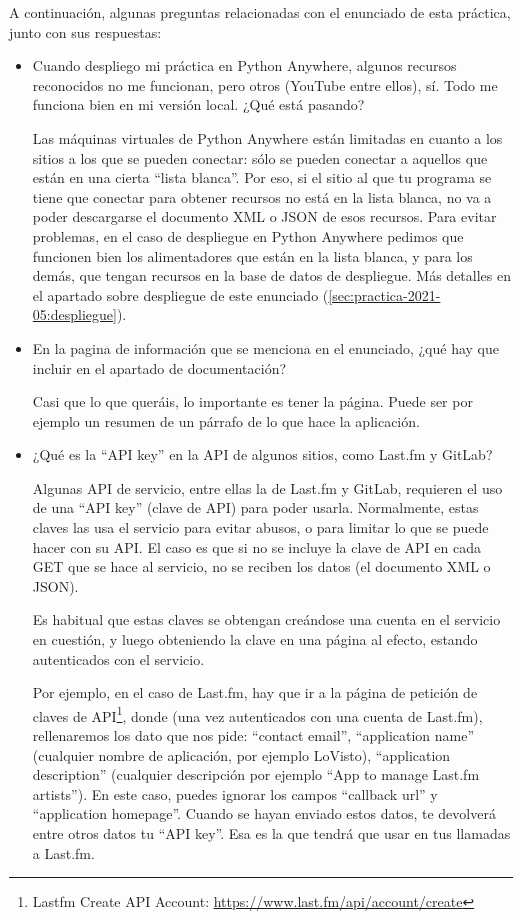 A continuación, algunas preguntas relacionadas con el enunciado de esta práctica, junto con sus respuestas:

\begin{itemize}

\item Cuando despliego mi práctica en Python Anywhere, algunos recursos reconocidos no me funcionan, pero otros (YouTube entre ellos), sí. Todo me funciona bien en mi versión local. ¿Qué está pasando?

  Las máquinas virtuales de Python Anywhere están limitadas en cuanto a los sitios a los que se pueden conectar: sólo se pueden conectar a aquellos que están en una cierta ``lista blanca''. Por eso, si el sitio al que tu programa se tiene que conectar para obtener recursos no está en la lista blanca, no va a poder descargarse el documento XML o JSON de esos recursos. Para evitar problemas, en el caso de despliegue en Python Anywhere pedimos que funcionen bien los alimentadores que están en la lista blanca, y para los demás, que tengan recursos en la base de datos de despliegue. Más detalles en el apartado sobre despliegue de este enunciado (\ref{sec:practica-2021-05:despliegue}).
  
\item En la pagina de información que se menciona en el enunciado, ¿qué hay que incluir en el apartado de documentación?

Casi que lo que queráis, lo importante es tener la página. Puede ser por ejemplo un resumen de un párrafo de lo que hace la aplicación.

\item ¿Qué es la ``API key'' en la API de algunos sitios, como Last.fm y GitLab?
\label{sec:practica-2021-05:preguntas-apikey}

  Algunas API de servicio, entre ellas la de Last.fm y GitLab, requieren el uso de una ``API key'' (clave de API) para poder usarla. Normalmente, estas claves las usa el servicio para evitar abusos, o para limitar lo que se puede hacer con su API. El caso es que si no se incluye la clave de API en cada GET que se hace al servicio, no se reciben los datos (el documento XML o JSON).

  Es habitual que estas claves se obtengan creándose una cuenta en el servicio en cuestión, y luego obteniendo la clave en una página al efecto, estando autenticados con el servicio.

  Por ejemplo, en el caso de Last.fm, hay que ir a la página de petición de claves de API\footnote{Lastfm Create API Account: \url{https://www.last.fm/api/account/create}}, donde (una vez autenticados con una cuenta de Last.fm), rellenaremos los dato que nos pide: ``contact email'', ``application name'' (cualquier nombre de aplicación, por ejemplo LoVisto), ``application description'' (cualquier descripción por ejemplo ``App to manage Last.fm artists''). En este caso, puedes ignorar los campos ``callback url'' y ``application homepage''. Cuando se hayan enviado estos datos, te devolverá entre otros datos tu ``API key''. Esa es la que tendrá que usar en tus llamadas a Last.fm.


\end{itemize}
